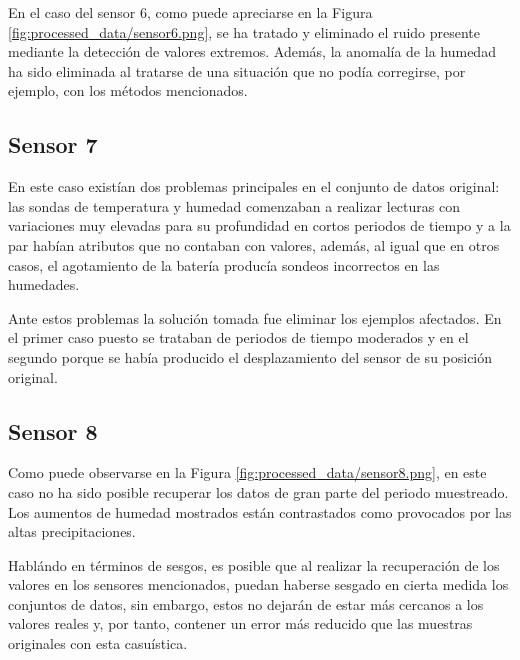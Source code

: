 En el caso del sensor 6, como puede apreciarse en la Figura 
\ref{fig:processed_data/sensor6.png}, se ha tratado y eliminado el ruido presente 
mediante la detección de valores extremos. Además, la anomalía de la humedad ha sido
eliminada al tratarse de una situación que no podía corregirse, por ejemplo, con los
métodos mencionados.

\newpage

\subsection{Sensor 7}

En este caso existían dos problemas principales en el conjunto de datos original:
las sondas de temperatura y humedad comenzaban a realizar lecturas con variaciones
muy elevadas para su profundidad en cortos periodos de tiempo y a la par
habían atributos que no contaban con valores, además, al igual que en otros casos,
el agotamiento de la batería producía sondeos incorrectos en las humedades.

Ante estos problemas la solución tomada fue eliminar los ejemplos 
afectados. En el primer caso puesto se trataban de periodos de tiempo moderados y 
en el segundo porque se había producido el desplazamiento del sensor de su posición 
original.

\newpage

\subsection{Sensor 8}

Como puede observarse en la Figura \ref{fig:processed_data/sensor8.png}, en este caso
no ha sido posible recuperar los datos de gran parte del periodo muestreado.
Los aumentos de humedad mostrados están contrastados como 
provocados por las altas precipitaciones.

Hablándo en términos de sesgos, es posible que al realizar la recuperación de los
valores en los sensores mencionados, puedan haberse sesgado en cierta medida
los conjuntos de datos, sin embargo, estos no dejarán de estar más cercanos a los
valores reales y, por tanto, contener un error más reducido que las muestras originales
con esta casuística.